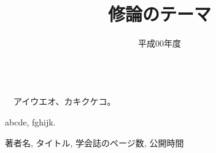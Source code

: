 \documentclass[a4paper]{jsarticle}
\begin{document}
 \masterthesis

\title{修論のテーマ}
\date{平成00年度}
\maketitle

\setcounter{page}{1} %
\\
\thispagestyle{plain}
　アイウエオ、カキクケコ。

\thispagestyle{plain}
abcde, fghijk.

\newpage

\makemokuji %

\newpage %

\setcounter{page}{1} %






\newpage

\begin{thebibliography}{999}

著者名, タイトル, 学会誌のページ数, 公開時間


\end{thebibliography}
\end{document}
